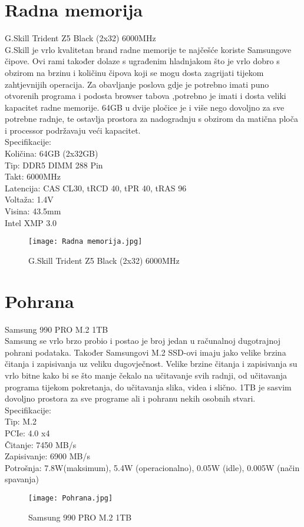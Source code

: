 \documentclass{report}
\begin{document}
\chapter{Radna memorija}
G.Skill Trident Z5 Black (2x32) 6000MHz
\\G.Skill je vrlo kvalitetan brand radne memorije te najčešće koriste Samsungove čipove. Ovi rami također dolaze s ugrađenim hladnjakom što je vrlo dobro s obzirom na brzinu i količinu čipova koji se mogu dosta zagrijati tijekom zahtjevnijih operacija. Za obavljanje poslova gdje je potrebno imati puno otvorenih programa i podosta browser tabova ,potrebno je imati i dosta veliki kapacitet radne memorije. 64GB u dvije pločice je i više nego dovoljno za sve potrebne radnje, te ostavlja prostora za nadogradnju s obzirom da matična ploča i processor podržavaju veći kapacitet.
\\Specifikacije:
\\Količina: 64GB (2x32GB)
\\Tip: DDR5 DIMM 288 Pin
\\Takt: 6000MHz
\\Latencija: CAS CL30, tRCD 40, tPR 40, tRAS 96
\\Voltaža: 1.4V
\\Visina: 43.5mm
\\Intel XMP 3.0
\begin{figure}[h]
\texttt{[image: Radna memorija.jpg]}
\caption{G.Skill Trident Z5 Black (2x32) 6000MHz}
\end{figure}



\chapter{Pohrana}
Samsung 990 PRO M.2 1TB
\\ Samsung se vrlo brzo probio i postao je broj jedan u računalnoj dugotrajnoj pohrani podataka. Također Samsungovi M.2 SSD-ovi imaju jako velike brzina čitanja i zapisivanja uz veliku dugovječnost. Velike brzine čitanja i zapisivanja su vrlo bitne kako bi se što manje čekalo na učitavanje svih radnji, od učitavanja programa tijekom pokretanja, do učitavanja slika, videa i slično. 1TB je sasvim dovoljno prostora za sve programe ali i pohranu nekih osobnih stvari.
\\Specifikacije:
\\Tip: M.2
\\PCIe: 4.0 x4
\\Čitanje: 7450 MB/s
\\Zapisivanje: 6900 MB/s
\\Potrošnja: 7.8W(maksimum), 5.4W (operacionalno), 0.05W (idle), 0.005W (način spavanja)
\begin{figure}[h]
\texttt{[image: Pohrana.jpg]}
\caption{Samsung 990 PRO M.2 1TB}
\end{figure}
\end{document}
